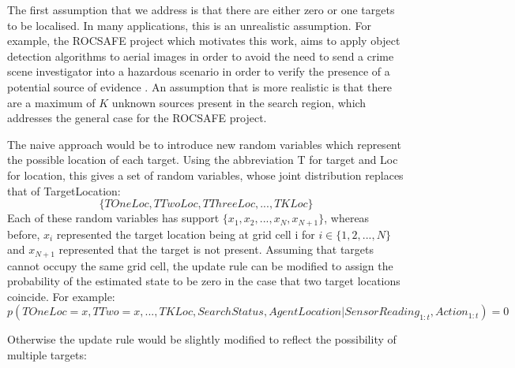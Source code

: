 The first assumption that we address is that there are either zero or one targets to be localised. In many applications, this is an unrealistic assumption. For example, the ROCSAFE project which motivates this work, aims to apply object detection algorithms to aerial images in order to avoid the need to send a crime scene investigator into a hazardous scenario in order to verify the presence of a potential source of evidence \cite{Bagherzadeh2017ROCSAFE:Incidents}. An assumption that is more realistic is that there are a maximum of $K$ unknown sources present in the search region, which addresses the general case for the ROCSAFE  project.\par

The naive approach would be to introduce new random variables which represent the possible location of each target. Using the abbreviation T for target and Loc for location, this gives a set of random variables, whose joint distribution replaces that of TargetLocation: \[\{TOneLoc, TTwoLoc, TThreeLoc,...,TKLoc\}\] Each of these random variables has support $\{x_1, x_2, ..., x_N, x_{N+1}\}$, whereas before, $x_i$ represented the target location being at grid cell i for $i \in \{1,2, ..., N\}$ and $x_{N+1}$ represented that the target is not present. 
Assuming that targets cannot occupy the same grid cell, the update rule can be modified to assign the probability of the estimated state to be zero in the case that two target locations coincide. For example:
\footnotesize{
\[p(TOneLoc = x, TTwo = x, ..., TKLoc, SearchStatus, AgentLocation | SensorReading_{1:t}, Action_{1:t}) = 0\]}

\normalsize
Otherwise the update rule would be slightly modified to reflect the possibility of multiple targets: 


\scriptsize

